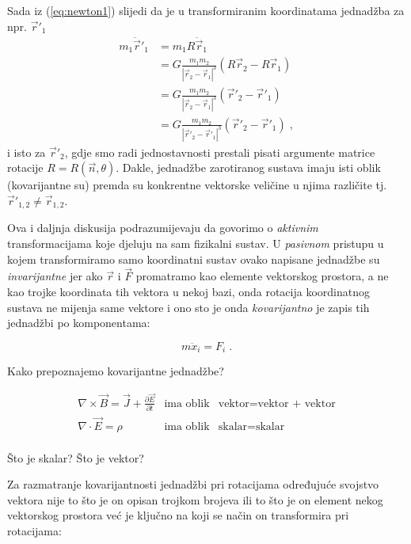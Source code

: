 Sada iz (\ref{eq:newton1}) slijedi da je u transformiranim koordinatama
jednadžba za npr. $\vec{r}'_1$ 
\begin{equation*}
\begin{split}
m_1 \ddot{\vec{r}}'_1 &= m_1 R \ddot{\vec{r}}_1 \\
   &= G \frac{m_1 m_2}{|\vec{r}_2 - \vec{r}_1|^3}
    (R\vec{r}_2 - R\vec{r}_1) \\
   &= G \frac{m_1 m_2}{|\vec{r}_2 - \vec{r}_1|^3}
    (\vec{r}'_2 - \vec{r}'_1) \\
   &= G \frac{m_1 m_2}{|\vec{r}'_2 - \vec{r}'_1|^3}
    (\vec{r}'_2 - \vec{r}'_1) \;,
\end{split}
\end{equation*}
i isto za $\vec{r}'_2$, gdje smo radi jednostavnosti prestali
pisati argumente matrice rotacije $R = R(\vec{n},\theta)$.
Dakle, jednadžbe zarotiranog sustava imaju isti oblik
(kovarijantne su) premda su konkrentne vektorske veličine
u njima različite tj. $\vec{r}'_{1,2} \neq \vec{r}_{1,2}$.

Ova i daljnja diskusija podrazumijevaju da govorimo o \emph{aktivnim}
transformacijama koje djeluju na sam fizikalni sustav. U \emph{pasivnom}
pristupu u kojem transformiramo samo koordinatni sustav
ovako napisane jednadžbe su \emph{invarijantne} jer
ako $\vec{r}$ i $\vec{F}$ promatramo kao elemente vektorskog prostora,
a ne kao trojke koordinata tih vektora u nekoj bazi, onda rotacija
koordinatnog sustava ne mijenja same vektore i ono sto je onda
\emph{kovarijantno} je zapis tih jednadžbi po komponentama:
        
\begin{displaymath}
       m  \ddot{x}_{i} =  F_{i} \;.
\end{displaymath}


Kako prepoznajemo kovarijantne jednadžbe?

\begin{eqnarray*}
 \nabla\times\vec{B}=\vec{J}+\frac{\partial \vec{E}}{\partial t}
    &\textrm{ima oblik}&  \textrm{vektor=vektor + vektor} \\
 \nabla\cdot\vec{E}=\rho
    &\textrm{ima oblik}&  \textrm{skalar=skalar} \\
\end{eqnarray*}

 Što je skalar? Što je vektor?

Za razmatranje kovarijantnosti jednadžbi pri rotacijama određujuće svojstvo 
vektora nije to što je on opisan trojkom brojeva ili 
to što je on element nekog vektorskog prostora već je ključno na koji
se način on transformira pri rotacijama:

